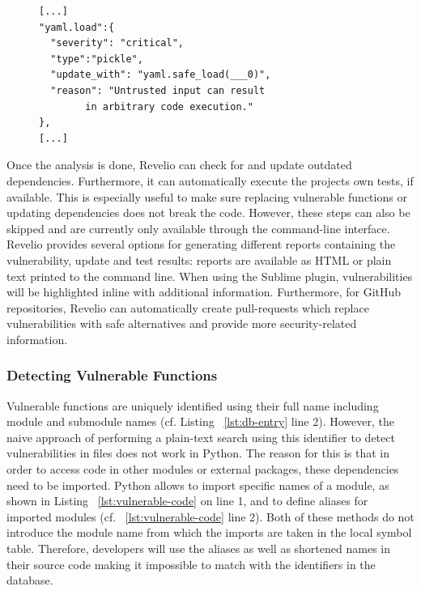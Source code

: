 \begin{figure}[!h]
    \centering
    \begin{lstlisting}[caption={Entry in the vulnerability database},captionpos=b, label={lst:db-entry}]
[...]
"yaml.load":{
  "severity": "critical",
  "type":"pickle",
  "update_with": "yaml.safe_load(___0)",
  "reason": "Untrusted input can result  
        in arbitrary code execution."
},
[...]
\end{lstlisting}
\end{figure}

Once the analysis is done, Revelio can check for and update outdated dependencies. Furthermore, it can automatically execute the projects own tests, if available. This is especially useful to make sure replacing vulnerable functions or updating dependencies does not break the code. However, these steps can also be skipped and are currently only available through the command-line interface. Revelio provides several options for generating different reports containing the vulnerability, update and test results: reports are available as HTML or plain text printed to the command line. When using the Sublime plugin, vulnerabilities will be highlighted inline with additional information. Furthermore, for GitHub repositories, Revelio can automatically create pull-requests which replace vulnerabilities with safe alternatives and provide more security-related information.

\subsubsection{Detecting Vulnerable Functions}


Vulnerable functions are uniquely identified using their full name including module and submodule names (cf. Listing ~\ref{lst:db-entry} line 2). However, the naive approach of performing a plain-text search using this identifier to detect vulnerabilities in files does not work in Python. The reason for this is that in order to access code in other modules or external packages, these dependencies need to be imported. Python allows to import specific names of a module, as shown in Listing ~\ref{lst:vulnerable-code} on line 1, and to define aliases for imported modules (cf. ~\ref{lst:vulnerable-code} line 2). Both of these methods do not introduce the module name from which the imports are taken in the local symbol table. Therefore, developers will use the aliases as well as shortened names in their source code making it impossible to match with the identifiers in the database.

